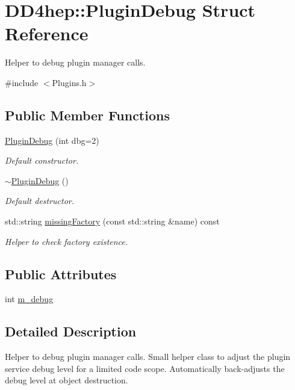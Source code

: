 \hypertarget{struct_d_d4hep_1_1_plugin_debug}{
\section{DD4hep::PluginDebug Struct Reference}
\label{struct_d_d4hep_1_1_plugin_debug}
}


Helper to debug plugin manager calls.  


{\ttfamily \#include $<$Plugins.h$>$}\subsection*{Public Member Functions}
\begin{DoxyCompactItemize}
\item 
\hyperlink{struct_d_d4hep_1_1_plugin_debug_a26deb60f08bc415d15c180a7fb5167b5}{PluginDebug} (int dbg=2)
\begin{DoxyCompactList}\small\item\em Default constructor. \item\end{DoxyCompactList}\item 
\hyperlink{struct_d_d4hep_1_1_plugin_debug_a5c64d5a172b4d20b94d7a367e09a58f1}{$\sim$PluginDebug} ()
\begin{DoxyCompactList}\small\item\em Default destructor. \item\end{DoxyCompactList}\item 
std::string \hyperlink{struct_d_d4hep_1_1_plugin_debug_a93143c7d731e176fe8c7a791edf01c28}{missingFactory} (const std::string \&name) const 
\begin{DoxyCompactList}\small\item\em Helper to check factory existence. \item\end{DoxyCompactList}\end{DoxyCompactItemize}
\subsection*{Public Attributes}
\begin{DoxyCompactItemize}
\item 
int \hyperlink{struct_d_d4hep_1_1_plugin_debug_afb83475b5c5eb7cb5410b94972627a20}{m\_\-debug}
\end{DoxyCompactItemize}


\subsection{Detailed Description}
Helper to debug plugin manager calls. Small helper class to adjust the plugin service debug level for a limited code scope. Automatically back-\/adjusts the debug level at object destruction.

